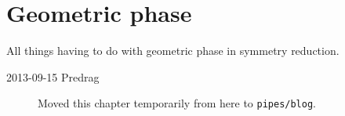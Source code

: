

\chapter{Geometric phase}
\label{c-geometric}

All things having to do with geometric phase in symmetry reduction.

\begin{description}

\item[2013-09-15 Predrag] Moved this chapter temporarily from
here to \texttt{pipes/blog}.

\end{description}
